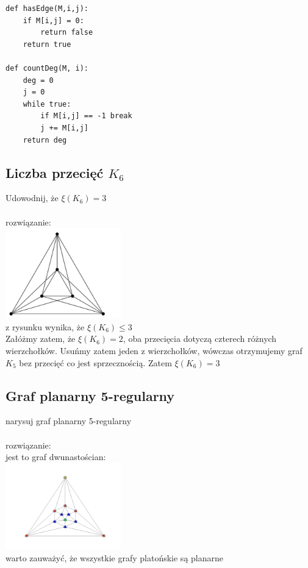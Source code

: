 \documentclass{article}
\begin{document}
\begin{lstlisting}
def hasEdge(M,i,j):
	if M[i,j] = 0:
		return false
	return true

def countDeg(M, i):
	deg = 0
	j = 0
	while true:
		if M[i,j] == -1 break
		j += M[i,j]
 	return deg

\end{lstlisting}



\subsection*{Liczba przecięć $K_6$}
Udowodnij, że $\xi(K_6) = 3$ \\\\rozwiązanie: \\
\includegraphics[width=5cm]{k6}\\
z rysunku wynika, że $\xi(K_6) \leq 3$ \\
Załóżmy zatem, że $\xi(K_6) = 2$, oba przecięcia dotyczą czterech różnych wierzchołków.  
Usuńmy zatem jeden z wierzchołków, wówczas otrzymujemy graf $K_5$ bez przecięć co jest sprzecznością.
Zatem $\xi(K_6)=3$

\subsection*{Graf planarny 5-regularny}
narysuj graf planarny 5-regularny \\\\ rozwiązanie: \\
jest to graf dwunastościan: \\
\includegraphics[width=5cm]{icosahedron} \\
warto zauważyć, że wszystkie grafy platońskie są planarne
\end{document}
